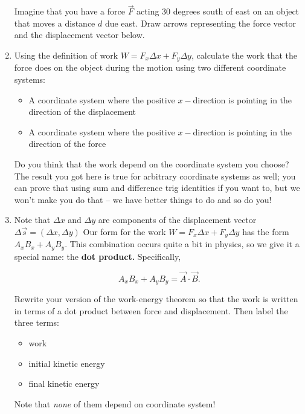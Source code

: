 \documentclass[12pt]{article}
\begin{document}
\begin{enumerate}
Imagine that you have a force $\vec F$ acting 30 degrees south of east on an object that moves a distance $d$ due east. Draw arrows representing the force vector and the displacement vector below.

\item Using the definition of work $W = F_x \Delta x + F_y \Delta y$, calculate the work that the force does on the object during the motion using two different coordinate systems:

\begin{itemize}
\item A coordinate system where the positive $x-$direction is pointing in the direction of the displacement

\item A coordinate system where the positive $x-$direction is pointing in the direction of the force
\end{itemize}

Do you think that the work depend on the coordinate system you choose? The result you got here is true for arbitrary coordinate systems as well; you can prove that using sum and difference trig identities if you want to, but we won't make you do that -- we have better things to do and so do you!

\item Note that $\Delta x$ and $\Delta y$ are components of the displacement vector $\Delta \vec s = (\Delta x, \Delta y)$ Our form for the work $W = F_x \Delta x + F_y \Delta y$ has the form $A_x B_x + A_y B_y$. This combination occurs quite a bit in physics, so we give it a special name: the {\bf dot product.} Specifically,

$$A_x B_x + A_y B_y = \vec A \cdot \vec B.$$

Rewrite your version of the work-energy theorem so that the work is written in terms of a dot product between force and displacement. Then label the three terms:

\begin{itemize}
\item work
\item initial kinetic energy
\item final kinetic energy
\end{itemize}

Note that {\it none} of them depend on coordinate system!

\end{enumerate}
\end{document}
